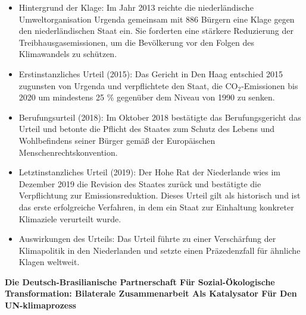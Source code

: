 \documentclass[a4paper, 12pt]{article} %
\begin{document}
\begin{itemize}
   \item Hintergrund der Klage: Im Jahr 2013 reichte die niederländische Umweltorganisation Urgenda gemeinsam mit 886 Bürgern eine Klage gegen den niederländischen Staat ein. Sie forderten eine stärkere Reduzierung der Treibhausgasemissionen, um die Bevölkerung vor den Folgen des Klimawandels zu schützen.
   \item Erstinstanzliches Urteil (2015): Das Gericht in Den Haag entschied 2015 zugunsten von Urgenda und verpflichtete den Staat, die CO$_2$-Emissionen bis 2020 um mindestens 25 \% gegenüber dem Niveau von 1990 zu senken.
   \item Berufungsurteil (2018): Im Oktober 2018 bestätigte das Berufungsgericht das Urteil und betonte die Pflicht des Staates zum Schutz des Lebens und Wohlbefindens seiner Bürger gemäß der Europäischen Menschenrechtskonvention.
   \item Letztinstanzliches Urteil (2019): Der Hohe Rat der Niederlande wies im Dezember 2019 die Revision des Staates zurück und bestätigte die Verpflichtung zur Emissionsreduktion. Dieses Urteil gilt als historisch und ist das erste erfolgreiche Verfahren, in dem ein Staat zur Einhaltung konkreter Klimaziele verurteilt wurde.
   \item Auswirkungen des Urteils: Das Urteil führte zu einer Verschärfung der Klimapolitik in den Niederlanden und setzte einen Präzedenzfall für ähnliche Klagen weltweit.
\end{itemize}

\textbf{\cite{konneke2024deutsch} Die Deutsch-Brasilianische Partnerschaft Für Sozial-Ökologische Transformation: {{Bilaterale}} Zusammenarbeit Als Katalysator Für Den {{UN-klimaprozess}}}
\end{document}
